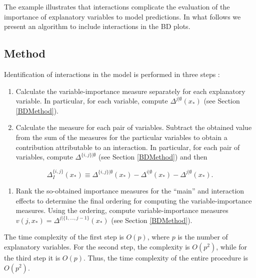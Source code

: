 \documentclass[12pt,]{krantz}
\providecommand{\tightlist}{%
  \setlength{\itemsep}{0pt}\setlength{\parskip}{0pt}}
\begin{document}
The example illustrates that interactions complicate the evaluation of the importance of explanatory variables to model predictions. In what follows we present an algorithm to include interactions in the BD plots.

\hypertarget{iBDMethod}{%
\subsection{Method}\label{iBDMethod}}

Identification of interactions in the model is performed in three steps \citep{iBreakDownRPackage}:

\begin{enumerate}
\def\labelenumi{\arabic{enumi}.}
\tightlist
\item
  Calculate the variable-importance measure separately for each explanatory variable. In particular, for each variable, compute \(\Delta^{j|\emptyset}(x_*)\) (see Section \ref{BDMethod}).
\item
  Calculate the measure for each pair of variables. Subtract the obtained value from the sum of the measures for the particular variables to obtain a contribution attributable to an interaction. In particular, for each pair of variables, compute \(\Delta^{\{i,j\}|\emptyset}\) (see Section \ref{BDMethod}) and then
\end{enumerate}

\begin{equation}
\Delta^{\{i,j\}}_I(x_*) \equiv \Delta^{\{i,j\}|\emptyset}(x_*)-\Delta^{i|\emptyset}(x_*)-\Delta^{j|\emptyset}(x_*).
\label{eq:deltaBreakDownInteractions}
\end{equation}

\begin{enumerate}
\def\labelenumi{\arabic{enumi}.}
\setcounter{enumi}{2}
\tightlist
\item
  Rank the so-obtained importance measures for the ``main'' and interaction effects to determine the final ordering for computing the variable-importance measures. Using the ordering, compute variable-importance measures \(v(j, x_*) = \Delta^{j|\{1, ..., j-1\}}(x_*)\) (see Section \ref{BDMethod}).
\end{enumerate}

The time complexity of the first step is \(O(p)\), where \(p\) is the number of explanatory variables. For the second step, the complexity is \(O(p^2)\), while for the third step it is \(O(p)\). Thus, the time complexity of the entire procedure is \(O(p^2)\).
\end{document}
